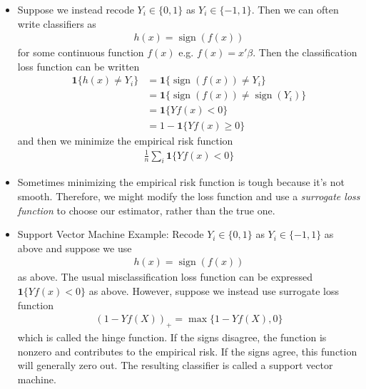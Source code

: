\documentclass[12pt]{article}
\theoremstyle{plain}
\theoremstyle{definition}
\theoremstyle{remark}
\newcommand{\sign}{\operatorname{sign}}
\begin{document}
\begin{itemize}
  \item
    Suppose we instead recode $Y_i\in\{0,1\}$ as $Y_i\in\{-1,1\}$.
    Then we can often write classifiers as
    \begin{align*}
      h(x) = \sign(f(x))
    \end{align*}
    for some continuous function $f(x)$ e.g. $f(x)=x'\beta$.
    Then the classification loss function can be written
    \begin{align*}
      \mathbf{1}\{h(x)\neq Y_i\}
      &=
      \mathbf{1}\{\sign(f(x))\neq Y_i\}
      \\
      &=
      \mathbf{1}\{\sign(f(x))\neq \sign(Y_i)\}
      \\
      &=
      \mathbf{1}\{Yf(x)< 0\}
      \\
      &=
      1-\mathbf{1}\{Yf(x)\geq 0\}
    \end{align*}
    and then we minimize the empirical risk function
    \begin{align*}
      \frac{1}{n}
      \sum_i
      \mathbf{1}\{Yf(x)< 0\}
    \end{align*}

  \item
    Sometimes minimizing the empirical risk function is tough because
    it's not smooth.
    Therefore, we might modify the loss function and use a
    \emph{surrogate loss function} to choose our estimator, rather than
    the true one.

  \item
    Support Vector Machine Example:
    Recode $Y_i\in\{0,1\}$ as $Y_i\in\{-1,1\}$ as above and suppose we
    use
    \begin{align*}
      h(x) = \sign(f(x))
    \end{align*}
    as above.
    The usual misclassification loss function can be expressed
    $\mathbf{1}\{Yf(x)<0\}$ as above.
    However, suppose we instead use surrogate loss function
    \begin{align*}
      (1-Y f(X))_+
      =
      \max\{1-Y f(X),0\}
    \end{align*}
    which is called the hinge function.
    If the signs disagree, the function is nonzero and contributes to
    the empirical risk.
    If the signs agree, this function will generally zero out.
    The resulting classifier is called a support vector machine.


\end{itemize}
\end{document}
